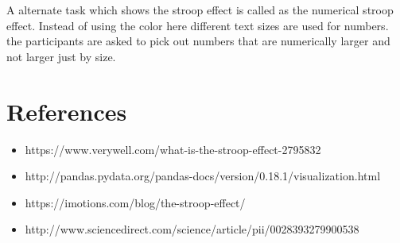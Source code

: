 \documentclass[12pt]{article}%
\begin{document}
A alternate task which shows the stroop effect is called as the numerical stroop effect. Instead of using the color here different text sizes are used for numbers. the participants are asked to pick out numbers that are numerically larger and not larger just by size.

\newpage
\section*{References}

 \begin{itemize}
 
  \item https://www.verywell.com/what-is-the-stroop-effect-2795832
  
  \item http://pandas.pydata.org/pandas-docs/version/0.18.1/visualization.html

  \item https://imotions.com/blog/the-stroop-effect/
  
  \item http://www.sciencedirect.com/science/article/pii/0028393279900538
  
 \end{itemize}
 
 
 
 
\end{document}
